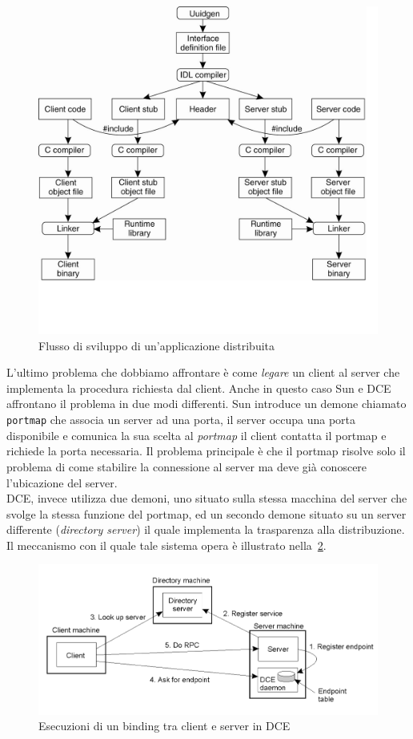 \begin{figure}
\centering
\includegraphics[scale=0.43]{img/program.png}
\caption{Flusso di sviluppo di un'applicazione distribuita}\label{img:program}
\end{figure}
L'ultimo problema che dobbiamo affrontare è come \emph{legare} un client al server che implementa la procedura richiesta dal client. Anche in questo caso Sun e DCE affrontano il problema in due modi differenti. Sun introduce un demone chiamato \texttt{portmap} che associa un server ad una porta, il server occupa una porta disponibile e comunica la sua scelta al \emph{portmap} il client contatta il portmap e richiede la porta necessaria. Il problema principale è che il portmap risolve solo il problema di come stabilire la connessione al server ma deve già conoscere l'ubicazione del server.\\
DCE, invece utilizza due demoni, uno situato sulla stessa macchina del server che svolge la stessa funzione del portmap, ed un secondo demone situato su un server differente (\emph{directory server}) il quale implementa la trasparenza alla distribuzione. Il meccanismo con il quale tale sistema opera è illustrato nella \figurename\,\ref{img:dcebinding}.
\begin{figure}
\centering
\includegraphics[scale=0.45]{img/dcebinding.png}
\caption{Esecuzioni di un binding tra client e server in DCE}\label{img:dcebinding}
\end{figure}

